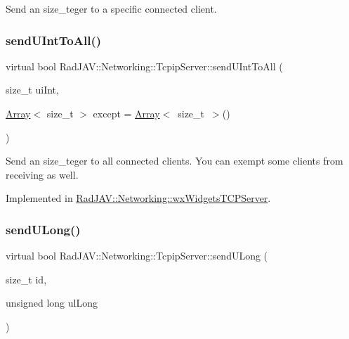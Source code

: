 Send an size\+\_\+teger to a specific connected client. \mbox{\label{class_rad_j_a_v_1_1_networking_1_1_tcpip_server_ab6768866944867f365b7a006f897838a}} 
\subsubsection{\texorpdfstring{send\+U\+Int\+To\+All()}{sendUIntToAll()}}
{\footnotesize\ttfamily virtual bool Rad\+J\+A\+V\+::\+Networking\+::\+Tcpip\+Server\+::send\+U\+Int\+To\+All (\begin{DoxyParamCaption}\item[{size\+\_\+t}]{ui\+Int,  }\item[{\mbox{\hyperlink{class_rad_j_a_v_1_1_array}{Array}}$<$ size\+\_\+t $>$}]{except = {\ttfamily \mbox{\hyperlink{class_rad_j_a_v_1_1_array}{Array}}$<$~size\+\_\+t~$>$()} }\end{DoxyParamCaption})\hspace{0.3cm}{\ttfamily [pure virtual]}}

Send an size\+\_\+teger to all connected clients. You can exempt some clients from receiving as well. 

Implemented in \mbox{\hyperlink{class_rad_j_a_v_1_1_networking_1_1wx_widgets_t_c_p_server_ae5f1eb128e2895da1cc1f1015e08dfb4}{Rad\+J\+A\+V\+::\+Networking\+::wx\+Widgets\+T\+C\+P\+Server}}.

\mbox{\label{class_rad_j_a_v_1_1_networking_1_1_tcpip_server_af4220826c049f042293bce081ec27b94}} 
\subsubsection{\texorpdfstring{send\+U\+Long()}{sendULong()}}
{\footnotesize\ttfamily virtual bool Rad\+J\+A\+V\+::\+Networking\+::\+Tcpip\+Server\+::send\+U\+Long (\begin{DoxyParamCaption}\item[{size\+\_\+t}]{id,  }\item[{unsigned long}]{ul\+Long }\end{DoxyParamCaption})\hspace{0.3cm}{\ttfamily [pure virtual]}}

